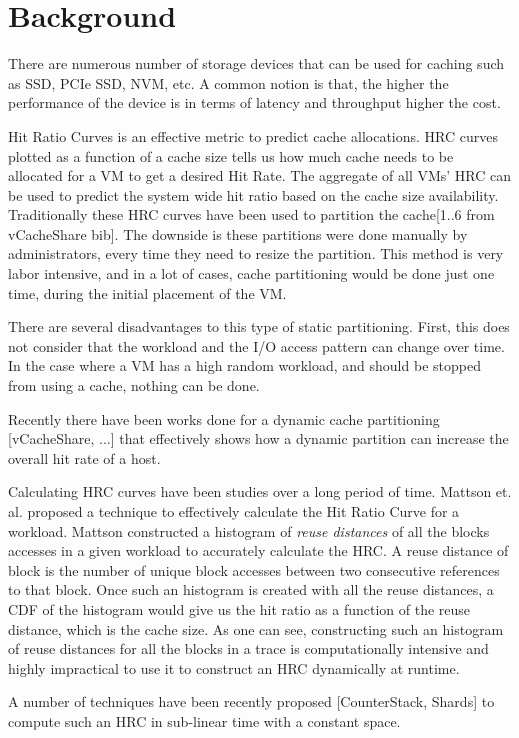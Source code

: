 \section{Background}

There are numerous number of storage devices that can be used for caching such as SSD, PCIe SSD, NVM, etc. A common notion is that, the higher the performance of the device is in terms of latency and throughput higher the cost.

Hit Ratio Curves is an effective metric to predict cache allocations. HRC curves plotted as a function of a cache size tells us how much cache needs to be allocated for a VM to get a desired Hit Rate. The aggregate of all VMs' HRC can be used to predict the system wide hit ratio based on the cache size availability. Traditionally these HRC curves have been used to partition the cache[1..6 from vCacheShare bib]. The downside is these partitions were done manually by administrators, every time they need to resize the partition. This method is very labor intensive, and in a lot of cases, cache partitioning would be done just one time, during the initial placement of the VM.

There are several disadvantages to this type of static partitioning. First, this does not consider that the workload and the I/O access pattern can change over time. In the case where a VM has a high random workload, and should be stopped from using a cache, nothing can be done.

Recently there have been works done for a dynamic cache partitioning [vCacheShare, ...] that effectively shows how a dynamic partition can increase the overall hit rate of a host.

Calculating HRC curves have been studies over a long period of time. Mattson et. al. proposed a technique to effectively calculate the Hit Ratio Curve for a workload. Mattson constructed a histogram of \emph{reuse distances} of all the blocks accesses in a given workload to accurately calculate the HRC. A reuse distance of block is the number of unique block accesses between two consecutive references to that block. Once such an histogram is created with all the reuse distances, a CDF of the histogram would give us the hit ratio as a function of the reuse distance, which is the cache size. As one can see, constructing such an histogram of reuse distances for all the blocks in a trace is computationally intensive and highly impractical to use it to construct an HRC dynamically at runtime.

A number of techniques have been recently proposed [CounterStack, Shards] to compute such an HRC in sub-linear time with a constant space.
